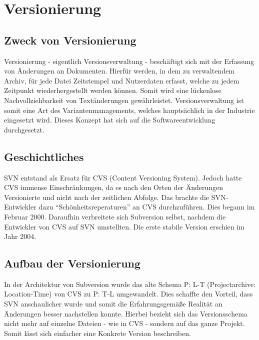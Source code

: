 \section{Versionierung}%

\subsection{Zweck von Versionierung}

Versionierung - eigentlich Versionsverwaltung - beschäftigt sich mit der Erfassung von Änderungen an Dokumenten. Hierfür werden, in dem zu verwaltendem Archiv, für jede Datei Zeitstempel und Nutzerdaten erfasst, welche zu jedem Zeitpunkt wiederhergestellt werden können. Somit wird eine lückenlose Nachvollziehbarkeit von Textänderungen gewährleistet. Versionsverwaltung ist somit eine Art des Variantenmanagements, welches hauptsächlich in der Industrie eingesetzt wird. Dieses Konzept hat sich auf die Softwareentwicklung durchgesetzt. 

\subsection{Geschichtliches}
SVN entstand als Ersatz für CVS (Content Versioning System). Jedoch hatte CVS immense Einschränkungen, da es nach den Orten der Änderungen Versionierte und nicht nach der zeitlichen Abfolge. Das brachte die SVN-Entwickler dazu "`Schönheitsreperaturen"' an CVS durchzuführen. Dies begann im Februar 2000. Daraufhin verbreitete sich Subversion selbst, nachdem die Entwickler von CVS auf SVN umstellten. Die erste stabile Version erschien im Jahr 2004.

\subsection{Aufbau der Versionierung}
In der Architektur von Subversion wurde das alte Schema P: L-T (Projectarchive: Location-Time) von CVS zu P: T-L umgewandelt. Dies schaffte den Vorteil, dass SVN anschaulicher wurde und somit die Erfahrungsgemäße Realität an Änderungen besser nachstellen konnte. Hierbei bezieht sich das Versionsschema nicht mehr auf einzelne Dateien - wie in CVS - sondern auf das ganze Projekt. Somit lässt sich einfacher eine Konkrete Version beschreiben. \\